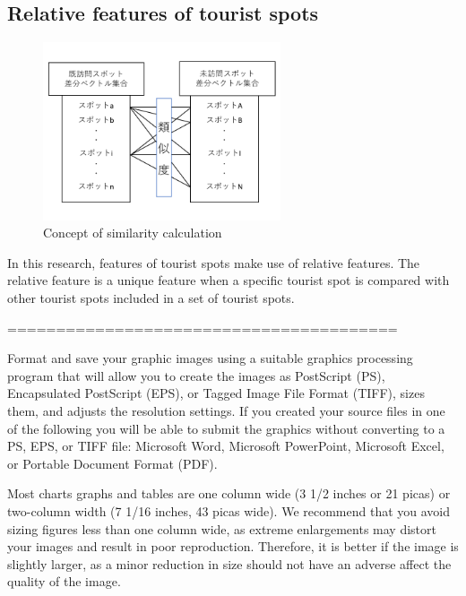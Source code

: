 \documentclass[journal]{IAENGtran}
\begin{document}
\subsection{Relative features of tourist spots}
\label{subsec:Relative features of tourist spots}

\begin{figure}[t]
  \begin{center}
    \includegraphics[clip,width=7.0cm]{picture/Photo_CosSim.png}
    \caption{Concept of similarity calculation}
    \label{fig:Photo_CosSim}
    \end{center}
\end{figure}

In this research, features of tourist spots make use of relative features. The relative feature is a unique feature when a specific tourist spot is compared with other tourist spots included in a set of tourist spots. 

========================================

Format and save your graphic images using a suitable graphics
processing program that will allow you to create the images as
PostScript (PS), Encapsulated PostScript (EPS), or Tagged Image File
Format (TIFF), sizes them, and adjusts the resolution settings. If
you created your source files in one of the following you will be
able to submit the graphics without converting to a PS, EPS, or TIFF
file: Microsoft Word, Microsoft PowerPoint, Microsoft Excel, or
Portable Document Format (PDF).

Most charts graphs and tables are one column wide (3 1/2 inches or
21 picas) or two-column width (7 1/16 inches, 43 picas wide). We
recommend that you avoid sizing figures less than one column wide,
as extreme enlargements may distort your images and result in poor
reproduction. Therefore, it is better if the image is slightly
larger, as a minor reduction in size should not have an adverse
affect the quality of the image.
\end{document}
